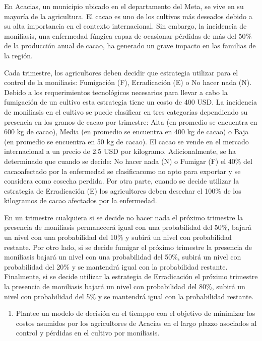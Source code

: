 \noindent En Acacias, un municipio ubicado en el departamento del Meta, se vive en su mayoría de la agricultura. El cacao es uno de los cultivos más deseados debido a su alta importancia en el contexto internacional. Sin embargo, la incidencia de moniliasis, una enfermedad fúngica capaz de ocasionar pérdidas de más del 50$\%$ de la producción anual de cacao, ha generado un grave impacto en las familias de la región.

\noindent Cada trimestre, los agricultores deben decidir que estrategia utilizar para el control de la moniliasis: Fumigación (F), Erradicación (E) o No hacer nada (N). Debido a los requerimientos tecnológicos necesarios para llevar a cabo la fumigación de un cultivo esta estrategia tiene un costo de 400 USD. La incidencia de moniliasis en el cultivo se puede clasificar en tres categorías dependiendo su presencia en los granos de cacao por trimestre: Alta (en promedio se encuentra en 600 kg de cacao), Media (en promedio se encuentra en 400 kg de cacao) o Baja (en promedio se encuentra en 50 kg de cacao). El cacao se vende en el mercado internacional a un precio de 2.5 USD por kilogramo. Adicionalmente, se ha determinado que cuando se decide: No hacer nada (N) o Fumigar (F) el 40$\%$ del cacaoafectado por la enfermedad se clasificacomo no apto para exportar y se considera como cosecha perdida. Por otra parte, cuando se decide utilizar la estrategia de Erradicación (E) los agricultores deben desechar el 100$\%$ de los kilogramos de cacao afectados por la enfermedad. 

\noindent En un trimestre cualquiera si se decide no hacer nada el próximo trimestre la presencia de moniliasis permanecerá igual con una probabilidad del 50$\%$, bajará un nivel con una probabilidad del 10$\%$ y subirá un nivel con probabilidad restante. Por otro lado, si se decide fumigar el próximo trimestre la presencia de moniliasis bajará un nivel con una probabilidad del 50$\%$, subirá un nivel con probabilidad del 20$\%$ y se mantendrá igual con la probabilidad restante. Finalmente, si se decide utilizar la estrategia de Erradicación el próximo trimestre la presencia de moniliasis bajará un nivel con probabilidad del 80$\%$, subirá un nivel con probabilidad del 5$\%$ y se mantendrá igual con la probabilidad restante. 

\begin{enumerate}
    \item Plantee un modelo de decisión en el tiemppo con el objetivo de minimizar los costos asumidos por los agricultores de Acacias en el largo plazzo asociados al control y pérdidas en el cultivo por moniliasis.
\end{enumerate}

